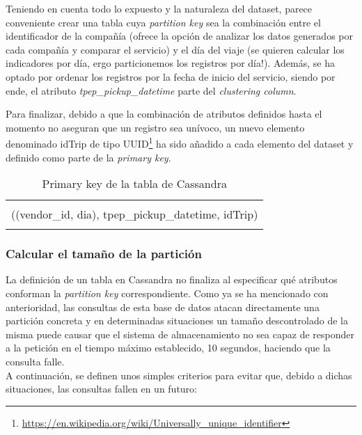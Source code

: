 Teniendo en cuenta todo lo expuesto y la naturaleza del dataset, parece conveniente crear una tabla cuya \textit{partition key} sea la combinación entre el identificador de la compañía (ofrece la opción de analizar los datos generados por cada compañía y comparar el servicio) y el día del viaje (se quieren calcular los indicadores por día, ergo particionemos los registros por día!). Además, se ha optado por ordenar los registros por la fecha de inicio del servicio, siendo por ende, el atributo \textit{tpep\_pickup\_datetime} parte del \textit{clustering column}.\\

\clearpage

Para finalizar, debido a que la combinación de atributos definidos hasta el momento no aseguran que un registro sea unívoco, un nuevo elemento denominado idTrip de tipo UUID\footnote{\url{https://en.wikipedia.org/wiki/Universally_unique_identifier}} ha sido añadido a cada elemento del dataset y definido como parte de la \textit{primary key}. 

\begin{table}[h!]
	\centering
	\begin{tabular}{|l|}
		
		\hline
		\\
		((vendor\_id, dia), tpep\_pickup\_datetime, idTrip) \\
		\\
		\hline
		
	\end{tabular}
	\caption{Primary key de la tabla de Cassandra}
	\label{primary_key_cassandra}
\end{table}

\subsubsection{Calcular el tamaño de la partición}

La definición de un tabla en Cassandra no finaliza al especificar qué atributos conforman la \textit{partition key} correspondiente. Como ya se ha mencionado con anterioridad, las consultas de esta base de datos atacan directamente una partición concreta y en determinadas situaciones un tamaño descontrolado de la misma puede causar que el sistema de almacenamiento no sea capaz de responder a la petición en el tiempo máximo establecido, 10 segundos, haciendo que la consulta falle.\\

A continuación, se definen unos simples criterios para evitar que, debido a dichas situaciones, las consultas fallen en un futuro:

